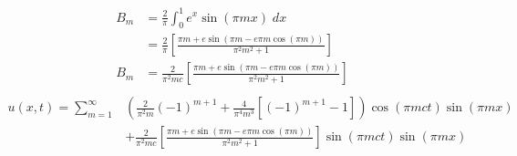 \documentclass[10pt]{article}
\begin{document}
\begin{align*}
    B_m &= \frac{2}{\pi}\int_0^1 e^x \sin(\pi mx)\; dx\\
    &= \frac{2}{\pi}\left[\frac{\pi m + e\sin(\pi m - e\pi m\cos(\pi m))}{\pi^2m^2 + 1}\right]\\
    B_m &= \frac{2}{\pi^2 mc }\left[\frac{\pi m + e\sin(\pi m - e\pi m\cos(\pi m))}{\pi^2m^2 + 1}\right]\\
\end{align*}
\begin{align*}
    u(x, t) = \sum_{m=1}^\infty &\left(\frac{2}{\pi^2m}(-1)^{m+1} + \frac{4}{\pi^4m^3}[(-1)^{m+1} - 1]\right)\cos(\pi mct)\sin(\pi m x)\\
    &+ \frac{2}{\pi^2 mc }\left[\frac{\pi m + e\sin(\pi m - e\pi m\cos(\pi m))}{\pi^2m^2 + 1}\right]\sin(\pi mct)\sin(\pi mx) 
\end{align*}
\end{document}
